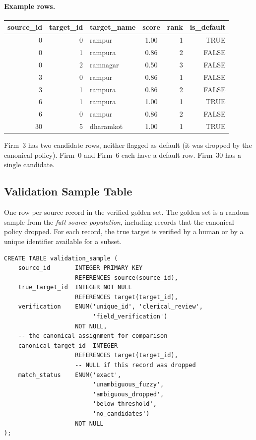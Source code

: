 \documentclass[12pt]{article}
\begin{document}
\paragraph{Example rows.}

\begin{center}
\small
\begin{tabular}{rrlcrr}
\toprule
source\_id & target\_id & target\_name & score & rank & is\_default \\
\midrule
0 & 0 & rampur & 1.00 & 1 & TRUE \\
0 & 1 & rampura & 0.86 & 2 & FALSE \\
0 & 2 & ramnagar & 0.50 & 3 & FALSE \\
3 & 0 & rampur & 0.86 & 1 & FALSE \\
3 & 1 & rampura & 0.86 & 2 & FALSE \\
6 & 1 & rampura & 1.00 & 1 & TRUE \\
6 & 0 & rampur & 0.86 & 2 & FALSE \\
30 & 5 & dharamkot & 1.00 & 1 & TRUE \\
\bottomrule
\end{tabular}
\end{center}

Firm~3 has two candidate rows, neither flagged as default (it was dropped by the canonical policy). Firm~0 and Firm~6 each have a default row. Firm~30 has a single candidate.

\subsection{Validation Sample Table}

One row per source record in the verified golden set. The golden set is a random sample from the \emph{full source population}, including records that the canonical policy dropped. For each record, the true target is verified by a human or by a unique identifier available for a subset.

\begin{lstlisting}[style=sql]
CREATE TABLE validation_sample (
    source_id       INTEGER PRIMARY KEY
                    REFERENCES source(source_id),
    true_target_id  INTEGER NOT NULL
                    REFERENCES target(target_id),
    verification    ENUM('unique_id', 'clerical_review',
                         'field_verification')
                    NOT NULL,
    -- the canonical assignment for comparison
    canonical_target_id  INTEGER
                    REFERENCES target(target_id),
                    -- NULL if this record was dropped
    match_status    ENUM('exact',
                         'unambiguous_fuzzy',
                         'ambiguous_dropped',
                         'below_threshold',
                         'no_candidates')
                    NOT NULL
);
\end{lstlisting}
\end{document}
